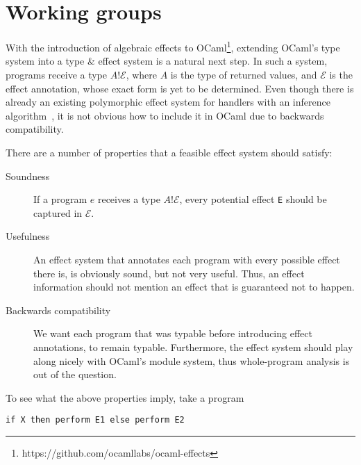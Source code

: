 \documentclass[a4paper,UKenglish]{dagrep}
\begin{document}


\section{Working groups}

\license

\newcommand{\effs}{\mathcal{E}}
\newcommand{\IO}{\mathtt{IO}}
\newcommand{\unitty}{\mathtt{unit}}
With the introduction of algebraic effects to OCaml\footnote{%
  https://github.com/ocamllabs/ocaml-effects
}, extending
OCaml's type system into a type \& effect system is a natural next step. In such a
system, programs receive a type $A ! \effs$, where $A$ is the type of returned
values, and $\effs$ is the effect annotation, whose exact form is yet to be
determined. Even though there is already an existing polymorphic effect system
for handlers with an inference algorithm~\cite{DBLP:journals/corr/Pretnar13}, it is not obvious how to
include it in OCaml due to backwards compatibility.

There are a number of properties that a feasible effect system should satisfy:
%
\begin{description}
\item[Soundness]
  If a program $e$ receives a type $A ! \effs$, every potential effect \verb|E| should be captured in $\effs$.
\item[Usefulness]
  An effect system that annotates each program with every possible effect there is,
  is obviously sound, but not very useful. Thus, an effect information should not
  mention an effect that is guaranteed not to happen.
\item[Backwards compatibility]
  We want each program that was typable before introducing effect annotations,
  to remain typable.
  Furthermore, the effect system should play along nicely with OCaml's module system,
  thus whole-program analysis is out of the question.
\end{description}
%
To see what the above properties imply, take a program

\verb|if X then perform E1 else perform E2|
\end{document}
